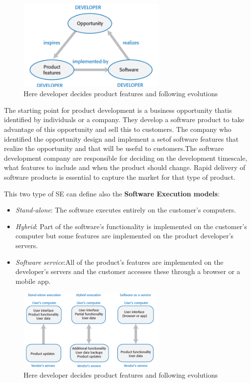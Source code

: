\documentclass[10pt,a4paper]{report}
\begin{document}
\begin{figure}[h]
	\centering
	\includegraphics[width=0.65\textwidth]{image02}
	\caption{Here developer decides product features and following evolutions}
	\label{image02}
\end{figure}

The starting point for product development is a business opportunity thatis identified by individuals or a company. They develop a software product to take advantage of this opportunity and sell this to customers. The company who identified the opportunity design and implement a setof software features that realize the opportunity and that will be useful to
customers.The software development company are responsible for deciding on the development timescale, what features to include and when the product should change. Rapid delivery of software products is essential to capture the market for that type of product.

This two type of SE can define also the \textbf{Software Execution models}:
\begin{itemize}
	\item \textit{Stand-alone}: The software executes entirely on the customer’s
	computers.
	\item \textit{Hybrid}: Part of the software’s functionality is implemented on the
	customer’s computer but some features are implemented on the product
	developer’s servers.
	\item \textit{Software service}:All of the product’s features are implemented on the
	developer’s servers and the customer accesses these through a browser
	or a mobile app.
\end{itemize}

\begin{figure}[h]
	\centering
	\includegraphics[width=0.65\textwidth]{image03}
	\caption{Here developer decides product features and following evolutions}
	\label{image03}
\end{figure}
\end{document}
